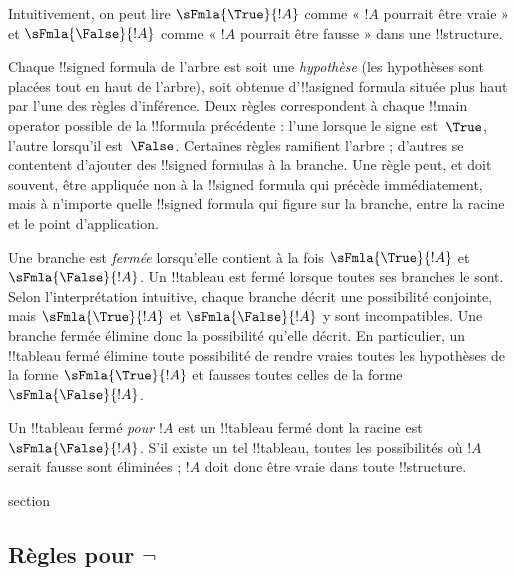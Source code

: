 \documentclass[11pt,a4paper,openany]{memoir}
\begin{document}
Intuitivement, on peut lire $\sFmla{\True}{!A}$ comme « $!A$ pourrait
être vraie » et $\sFmla{\False}{!A}$ comme « $!A$ pourrait être
fausse » dans une !!{structure}.

Chaque !!{signed formula} de l'arbre est soit une \emph{hypothèse}
(les hypothèses sont placées tout en haut de l'arbre), soit obtenue
d'!!a{signed formula} située plus haut par l'une des règles d'inférence.
Deux règles correspondent à chaque !!{main operator} possible de la
!!{formula} précédente : l'une lorsque le signe est~$\True$, l'autre
lorsqu'il est~$\False$. Certaines règles ramifient l'arbre ; d'autres
se contentent d'ajouter des !!{signed formula}s à la branche.
Une règle peut, et doit souvent, être appliquée non à la !!{signed formula}
qui précède immédiatement, mais à n'importe quelle !!{signed formula}
qui figure sur la branche, entre la racine et le point d'application.

Une branche est \emph{fermée} lorsqu'elle contient à la fois
$\sFmla{\True}{!A}$ et $\sFmla{\False}{!A}$. Un !!{tableau} est fermé
lorsque toutes ses branches le sont. Selon l'interprétation intuitive,
chaque branche décrit une possibilité conjointe, mais
$\sFmla{\True}{!A}$ et $\sFmla{\False}{!A}$ y sont incompatibles.
Une branche fermée élimine donc la possibilité qu'elle
décrit. En particulier, un !!{tableau} fermé élimine toute possibilité
de rendre vraies toutes les hypothèses de la forme
$\sFmla{\True}{!A}$ et fausses toutes celles de la forme
$\sFmla{\False}{!A}$.

Un !!{tableau} fermé \emph{pour $!A$} est un !!{tableau} fermé dont la
racine est~$\sFmla{\False}{!A}$. S'il existe un tel !!{tableau}, toutes
les possibilités où $!A$ serait fausse sont éliminées ; $!A$ doit donc
être vraie dans toute !!{structure}.


\endgroup



\begingroup
\expandafter\def\csname ol@sectioncs\endcsname{section}
\def\olfilename{propositional-rules}


      {}
      {}


\subsection{Règles pour $\lnot$}
\end{document}
